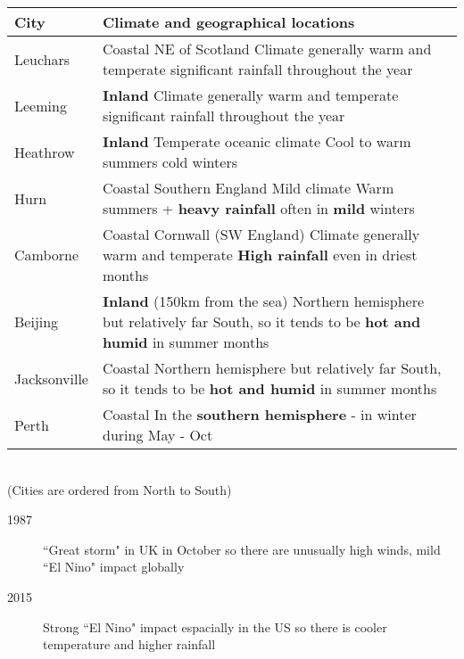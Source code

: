 \begin{tabular}{|p{2cm}|p{15cm}|}
	\hline
	\textbf{City} & \textbf{Climate and geographical locations} \\
	\hline
	Leuchars & Coastal \newline NE of Scotland \newline Climate generally warm and temperate \newline significant rainfall throughout the year\\
	\hline
	Leeming & \textbf{Inland} \newline Climate generally warm and temperate \newline significant rainfall throughout the year\\
	\hline
	Heathrow  & \textbf{Inland} \newline Temperate oceanic climate \newline Cool to warm summers \newline cold winters\\
	\hline
	Hurn  & Coastal \newline Southern England \newline Mild climate \newline Warm summers + \textbf{heavy rainfall} often in \textbf{mild} winters\\
	\hline
	Camborne & Coastal \newline Cornwall (SW England) \newline Climate generally warm and temperate \newline \textbf{High rainfall} even in driest months\\
	\hline
	Beijing  & \textbf{Inland} (150km from the sea) \newline Northern hemisphere but relatively far South, so it tends to be \textbf{hot and humid} in summer months\\
	\hline
	Jacksonville  & Coastal \newline Northern hemisphere but relatively far South, so it tends to be \textbf{hot and humid} in summer months \\
	\hline
	Perth & Coastal \newline In the \textbf{southern hemisphere} - in winter during May - Oct\\
	\hline
\end{tabular}\\
(Cities are ordered from North to South)

\begin{description}
	\item[1987] ``Great storm" in UK in October so there are unusually high winds, mild ``El Nino" impact globally
	\item[2015] Strong ``El Nino" impact espacially in the US so there is cooler temperature and higher rainfall
\end{description}

